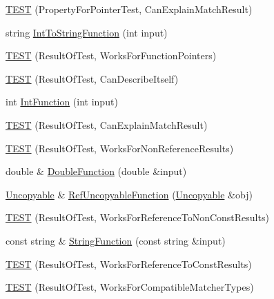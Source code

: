 \begin{DoxyCompactItemize}
\item 
\hyperlink{namespacetesting_1_1gmock__matchers__test_a1a7e2a9641a06e492d58c75d900330d3}{T\+E\+ST} (Property\+For\+Pointer\+Test, Can\+Explain\+Match\+Result)
\item 
string \hyperlink{namespacetesting_1_1gmock__matchers__test_a2399c4fae49f898c02f57a42047d80f2}{Int\+To\+String\+Function} (int input)
\item 
\hyperlink{namespacetesting_1_1gmock__matchers__test_a5aea17c7d3dd74cbc0cbf181b3a9e5f8}{T\+E\+ST} (Result\+Of\+Test, Works\+For\+Function\+Pointers)
\item 
\hyperlink{namespacetesting_1_1gmock__matchers__test_a1b5240d2272b679d7e3035554c2c5688}{T\+E\+ST} (Result\+Of\+Test, Can\+Describe\+Itself)
\item 
int \hyperlink{namespacetesting_1_1gmock__matchers__test_a6e957b9dcda1186c6274a8895d1514b5}{Int\+Function} (int input)
\item 
\hyperlink{namespacetesting_1_1gmock__matchers__test_ab7fe283b2955ca8bb11b2984a08eef33}{T\+E\+ST} (Result\+Of\+Test, Can\+Explain\+Match\+Result)
\item 
\hyperlink{namespacetesting_1_1gmock__matchers__test_a86f01e29ee48050d401fceca21d1041e}{T\+E\+ST} (Result\+Of\+Test, Works\+For\+Non\+Reference\+Results)
\item 
double \& \hyperlink{namespacetesting_1_1gmock__matchers__test_a48350ba4c1ce65694ec07e9c1c49a452}{Double\+Function} (double \&input)
\item 
\hyperlink{classtesting_1_1gmock__matchers__test_1_1_uncopyable}{Uncopyable} \& \hyperlink{namespacetesting_1_1gmock__matchers__test_aa6f7dd285163d5880cfd6685bec8cab4}{Ref\+Uncopyable\+Function} (\hyperlink{classtesting_1_1gmock__matchers__test_1_1_uncopyable}{Uncopyable} \&obj)
\item 
\hyperlink{namespacetesting_1_1gmock__matchers__test_a505e866c4066d27854cb6754c66a3eec}{T\+E\+ST} (Result\+Of\+Test, Works\+For\+Reference\+To\+Non\+Const\+Results)
\item 
const string \& \hyperlink{namespacetesting_1_1gmock__matchers__test_a5fdf1ecaf8e8e8ef5d57c311e675841d}{String\+Function} (const string \&input)
\item 
\hyperlink{namespacetesting_1_1gmock__matchers__test_a17b952cce22be6338fb1369f886d61c4}{T\+E\+ST} (Result\+Of\+Test, Works\+For\+Reference\+To\+Const\+Results)
\item 
\hyperlink{namespacetesting_1_1gmock__matchers__test_a1aceb307c843f0f5532053e390a7c654}{T\+E\+ST} (Result\+Of\+Test, Works\+For\+Compatible\+Matcher\+Types)

\end{DoxyCompactItemize}
